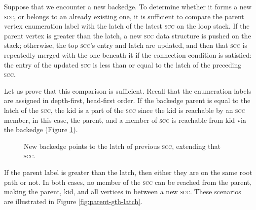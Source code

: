 \documentclass[twoside]{article}
\begin{document}
Suppose that we encounter a new backedge.  To determine whether it forms a new \textsc{scc}, or belongs to an already existing one, it is sufficient to compare the parent vertex enumeration label with the latch of the latest \textsc{scc} on the loop stack.  If the parent vertex is greater than the latch, a new \textsc{scc} data structure is pushed on the stack; otherwise, the top \textsc{scc}'s entry and latch are updated, and then that \textsc{scc} is repeatedly merged with the one beneath it if the connection condition is satisfied: the entry of the updated \textsc{scc} is less than or equal to the latch of the preceding \textsc{scc}.

Let us prove that this comparison is sufficient.  Recall that the enumeration labels are assigned in depth-first, head-first order.  If the backedge parent is equal to the latch of the \textsc{scc}, the kid is a part of the \textsc{scc} since the kid is reachable by an \textsc{scc} member, in this case, the parent, and a member of \textsc{scc} is reachable from kid via the backedge (Figure \ref{fig:parent-eq-latch}).

\begin{figure}[h]
  \centering
  \caption{New backedge points to the latch of previous \textsc{scc}, extending that \textsc{scc}.}
  \label{fig:parent-eq-latch}
\end{figure}

If the parent label is greater than the latch, then either they are on the same root path or not.  In both cases, no member of the \textsc{scc} can be reached from the parent, making the parent, kid, and all vertices in between a new \textsc{scc}. These scenarios are illustrated in Figure \ref{fig:parent-gth-latch}.
\end{document}
